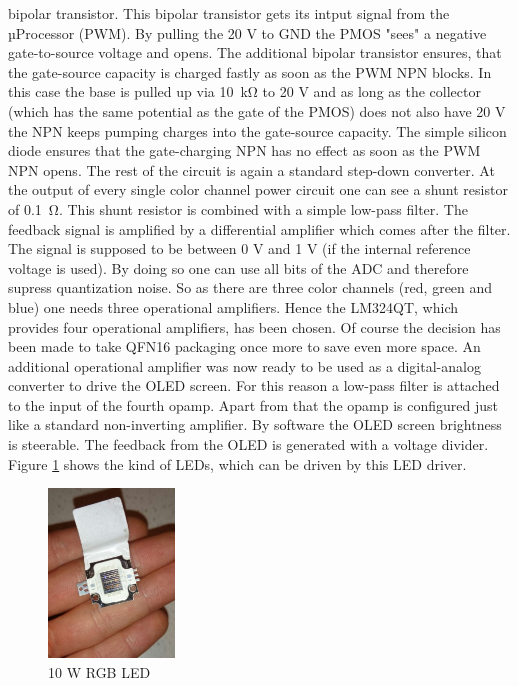 bipolar transistor. This bipolar transistor gets its intput signal from the
µProcessor (PWM). By pulling the 20 V to GND the PMOS "sees" a negative
gate-to-source voltage and opens. The additional bipolar transistor ensures,
that the gate-source capacity is charged fastly as soon as the PWM NPN blocks.
In this case the base is pulled up via \SI{10}{\kilo\ohm} to 20 V and as long as
the collector (which has the same potential as the gate of the PMOS) does not
also have 20 V the NPN keeps pumping charges into the gate-source capacity. The
simple silicon diode ensures that the gate-charging NPN has no effect as soon as
the PWM NPN opens. The rest of the circuit is again a standard step-down
converter. At the output of every single color channel power circuit one can see
a shunt resistor of \SI{0.1}{\ohm}. This shunt resistor is combined with a
simple low-pass filter. The feedback signal is amplified by a differential
amplifier which comes after the filter. The signal is supposed to be between 0 V
and 1 V (if the internal reference voltage is used). By doing so one can use all
bits of the ADC and therefore supress quantization noise. 
\newpar
So as there are three color channels (red, green and blue) one needs three
operational amplifiers. Hence the LM324QT, which provides four operational
amplifiers, has been chosen. Of course the decision has been made to take QFN16
packaging once more to save even more space. An additional operational amplifier
was now ready to be used as a digital-analog converter to drive the OLED screen.
For this reason a low-pass filter is attached to the input of the fourth opamp.
Apart from that the opamp is configured just like a standard non-inverting
amplifier. By software the OLED screen brightness is steerable. The feedback
from the OLED is generated with a voltage divider. 
\newpar
Figure \ref{fig:led} shows the kind of LEDs, which can be driven by this LED
driver.
\begin{figure}
	\centering
	\includegraphics[width=0.3\textwidth]{./fig/led.jpg}
	\caption{10 W RGB LED}
	\label{fig:led}
\end{figure} 

